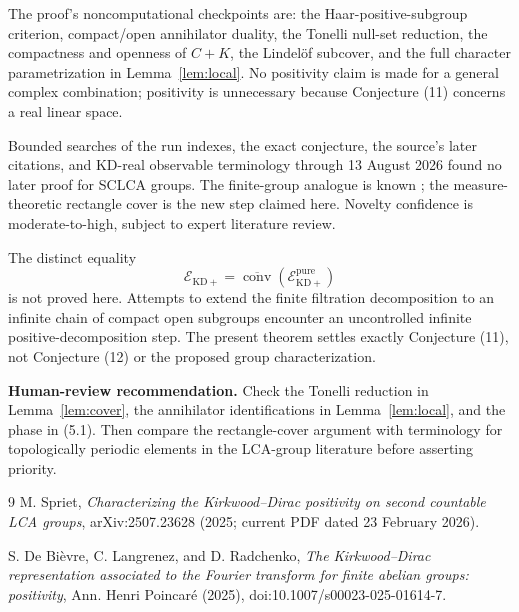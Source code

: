 \documentclass[11pt]{article}
\theoremstyle{remark}
\newcommand{\Epp}{\mathcal E_{\mathrm{KD}+}^{\mathrm{pure}}}
\begin{document}
The proof's noncomputational checkpoints are: the Haar-positive-subgroup
criterion, compact/open annihilator duality, the Tonelli null-set reduction,
the compactness and openness of $C+K$, the Lindel\"of subcover, and the full
character parametrization in Lemma~\ref{lem:local}.  No positivity claim is
made for a general complex combination; positivity is unnecessary because
Conjecture (11) concerns a real linear space.

Bounded searches of the run indexes, the exact conjecture, the source's later
citations, and KD-real observable terminology through 13 August 2026 found no
later proof for SCLCA groups.  The finite-group analogue is known
\cite{DLR}; the measure-theoretic rectangle cover is the new step claimed
here.  Novelty confidence is moderate-to-high, subject to expert literature
review.

The distinct equality
\[
 \mathcal E_{\mathrm{KD}+}
 =\overline{\operatorname{conv}}(\Epp)
\]
is not proved here.  Attempts to extend the finite filtration decomposition
to an infinite chain of compact open subgroups encounter an uncontrolled
infinite positive-decomposition step.  The present theorem settles exactly
Conjecture (11), not Conjecture (12) or the proposed group characterization.

\noindent\textbf{Human-review recommendation.}
Check the Tonelli reduction in Lemma~\ref{lem:cover}, the annihilator
identifications in Lemma~\ref{lem:local}, and the phase in (5.1).  Then compare
the rectangle-cover argument with terminology for topologically periodic
elements in the LCA-group literature before asserting priority.

\begin{thebibliography}{9}
M. Spriet,
\emph{Characterizing the Kirkwood--Dirac positivity on second countable LCA
groups}, arXiv:2507.23628 (2025; current PDF dated 23 February 2026).

S. De Bi\`evre, C. Langrenez, and D. Radchenko,
\emph{The Kirkwood--Dirac representation associated to the Fourier transform
for finite abelian groups: positivity}, Ann. Henri Poincar\'e (2025),
doi:10.1007/s00023-025-01614-7.
\end{thebibliography}
\end{document}
